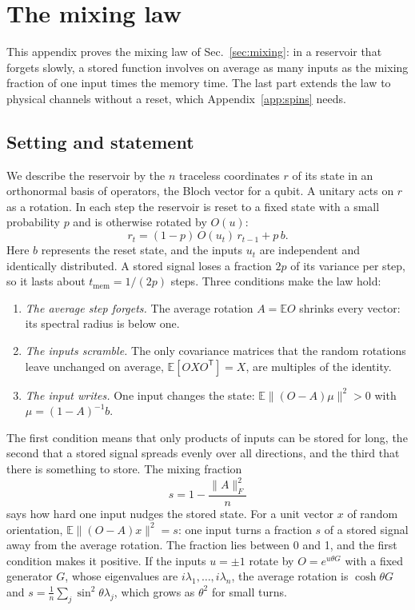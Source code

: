 \section{The mixing law}
\label{app:law}
This appendix proves the mixing law of Sec.~\ref{sec:mixing}: in a reservoir that forgets slowly, a stored function
involves on average as many inputs as the mixing fraction of one input times the memory time. The last part extends
the law to physical channels without a reset, which Appendix~\ref{app:spins} needs.

\subsection{Setting and statement}
We describe the reservoir by the $n$ traceless coordinates $r$ of its state in an orthonormal basis of operators, the
Bloch vector for a qubit. A unitary acts on $r$ as a rotation. In each step the reservoir is reset to a fixed state
with a small probability $p$ and is otherwise rotated by $O(u)$:
\begin{equation}
  r_t=(1-p)\,O(u_t)\,r_{t-1}+p\,b .
  \label{eq:reset}
\end{equation}
Here $b$ represents the reset state, and the inputs $u_t$ are independent and identically distributed. A stored
signal loses a fraction $2p$ of its variance per step, so it lasts about $t_{\mathrm{mem}}=1/(2p)$ steps. Three
conditions make the law hold:
\begin{enumerate}[label=(\arabic*),leftmargin=*,itemsep=2pt,topsep=4pt]
\item \emph{The average step forgets.} The average rotation $A=\mathbb EO$ shrinks every vector: its spectral radius
  is below one.
\item \emph{The inputs scramble.} The only covariance matrices that the random rotations leave unchanged on average,
  $\mathbb E[OXO^{\mathsf T}]=X$, are multiples of the identity.
\item \emph{The input writes.} One input changes the state: $\mathbb E\|(O-A)\mu\|^2>0$ with $\mu=(1-A)^{-1}b$.
\end{enumerate}
The first condition means that only products of inputs can be stored for long, the second that a stored signal
spreads evenly over all directions, and the third that there is something to store. The mixing fraction
\begin{equation}
  s=1-\frac{\|A\|_F^2}{n}
  \label{eq:mixing}
\end{equation}
says how hard one input nudges the stored state. For a unit vector $x$ of random orientation,
$\mathbb E\|(O-A)x\|^2=s$: one input turns a fraction $s$ of a stored signal away from the average rotation. The
fraction lies between 0 and 1, and the first condition makes it positive. If the inputs $u=\pm1$ rotate by
$O=e^{u\theta G}$ with a fixed generator $G$, whose eigenvalues are $i\lambda_1,\dots,i\lambda_n$, the average
rotation is $\cosh\theta G$ and $s=\frac1n\sum_j\sin^2\theta\lambda_j$, which grows as $\theta^2$ for small
turns.

